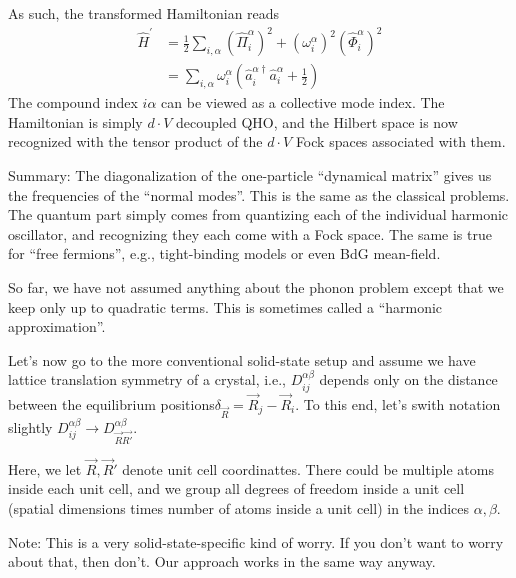As such, the transformed Hamiltonian reads
\begin{align*}
    \hat{H}^{\prime}&=\frac{1}{2}\sum_{i,\alpha}{\left( \hat{\Pi}_{i}^{\alpha} \right) ^2+\left( \omega _{i}^{\alpha} \right) ^2\left( \hat{\Phi}_{i}^{\alpha} \right) ^2}\\
    &=\sum_{i,\alpha}{\omega _{i}^{\alpha}\left( \hat{a}_{i}^{\alpha \dagger}\hat{a}_{i}^{\alpha}+\frac{1}{2} \right)}
\end{align*}
The compound index $i\alpha$ can be viewed as a collective mode index. The Hamiltonian is simply $d\cdot V$ decoupled QHO, and the Hilbert space is now recognized with the tensor product of the $d\cdot V$ Fock spaces associated with them.

Summary: The diagonalization of the one-particle ``dynamical matrix'' gives us the frequencies of the ``normal modes''. This is the same as the classical problems. The quantum part simply comes from quantizing each of the individual harmonic oscillator, and recognizing they each come with a Fock space. The same is true for ``free fermions'', e.g., tight-binding models or even BdG mean-field.

So far, we have not assumed anything about the phonon problem except that we keep only up to quadratic terms. This is sometimes called a ``harmonic approximation''.

Let's now go to the more conventional solid-state setup and assume we have lattice translation symmetry of a crystal, i.e., $D_{ij}^{\alpha\beta}$ depends only on the distance between the equilibrium positions$\delta_{\vec{R}}=\vec{R}_j-\vec{R}_i$. To this end, let's swith notation slightly $D_{ij}^{\alpha\beta}\to D_{\vec{R}\vec{R'}}^{\alpha\beta}$.

Here, we let $\vec{R},\vec{R}'$ denote unit cell coordinattes. There could be multiple atoms inside each unit cell, and we group all degrees of freedom inside a unit cell (spatial dimensions times number of atoms inside a unit cell) in the indices $\alpha,\beta$.

Note: This is a very solid-state-specific kind of worry. If you don't want to worry about that, then don't. Our approach works in the same way anyway.

